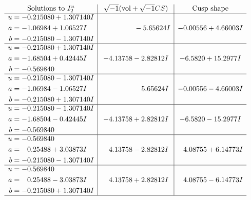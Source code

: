 \documentclass[1p]{elsarticle_modified}
\theoremstyle{definition}
\newcommand{\I}{\sqrt{-1}}
\begin{document}
$$\begin{array}{c|c|c}  
\text{Solutions to }I^u_{2}& \I (\text{vol} + \sqrt{-1}CS) & \text{Cusp shape}\\
 \hline 
\begin{aligned}
u &= -0.215080 + 1.307140 I \\
a &= -1.06984 + 1.06527 I \\
b &= -0.215080 - 1.307140 I\end{aligned}
 & \phantom{-0.000000 } -5.65624 I & -0.00556 + 4.66003 I \\ \hline\begin{aligned}
u &= -0.215080 + 1.307140 I \\
a &= -1.68504 + 0.42445 I \\
b &= -0.569840\phantom{ +0.000000I}\end{aligned}
 & -4.13758 - 2.82812 I & -6.5820 + 15.2977 I \\ \hline\begin{aligned}
u &= -0.215080 - 1.307140 I \\
a &= -1.06984 - 1.06527 I \\
b &= -0.215080 + 1.307140 I\end{aligned}
 & \phantom{-0.000000 -}5.65624 I & -0.00556 - 4.66003 I \\ \hline\begin{aligned}
u &= -0.215080 - 1.307140 I \\
a &= -1.68504 - 0.42445 I \\
b &= -0.569840\phantom{ +0.000000I}\end{aligned}
 & -4.13758 + 2.82812 I & -6.5820 - 15.2977 I \\ \hline\begin{aligned}
u &= -0.569840\phantom{ +0.000000I} \\
a &= \phantom{-}0.25488 + 3.03873 I \\
b &= -0.215080 - 1.307140 I\end{aligned}
 & \phantom{-}4.13758 - 2.82812 I & \phantom{-}4.08755 + 6.14773 I \\ \hline\begin{aligned}
u &= -0.569840\phantom{ +0.000000I} \\
a &= \phantom{-}0.25488 - 3.03873 I \\
b &= -0.215080 + 1.307140 I\end{aligned}
 & \phantom{-}4.13758 + 2.82812 I & \phantom{-}4.08755 - 6.14773 I\\
 \hline 
 \end{array}$$\newpage\newpage\renewcommand{\arraystretch}{1}
\end{document}
